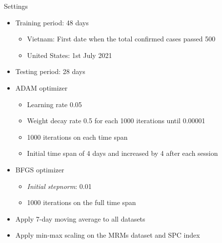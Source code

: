 \begin{frame}[allowframebreaks]{Settings}
    \begin{itemize}
        \item Training period: 48 days
        \begin{itemize}
            \item Vietnam: First date when the total confirmed cases passed 500
            \item United States: 1st July 2021
        \end{itemize}
        \item Testing period: 28 days
        \item ADAM optimizer
        \begin{itemize}
            \item Learning rate 0.05
            \item Weight decay rate 0.5 for each 1000 iterations until 0.00001
            \item 1000 iterations on each time span
            \item Initial time span of 4 days and increased by 4 after each session
        \end{itemize}
        \item BFGS optimizer
        \begin{itemize}
            \item \textit{Initial stepnorm}: 0.01
            \item 1000 iterations on the full time span
        \end{itemize}
    \end{itemize}

    \framebreak

    \begin{itemize}
        \item Apply 7-day moving average to all datasets
        \item Apply min-max scaling on the \glspl{MRM} dataset and \gls{SPC} index
    \end{itemize}

\end{frame}

